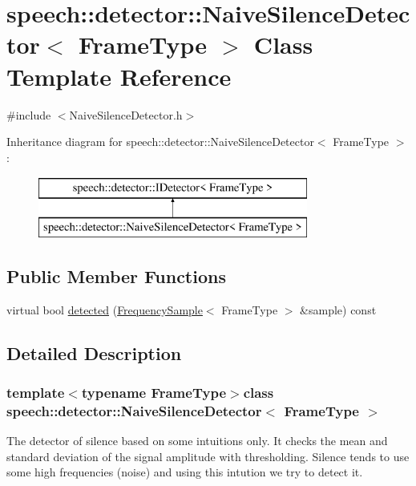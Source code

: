 \hypertarget{classspeech_1_1detector_1_1NaiveSilenceDetector}{\section{speech\+:\+:detector\+:\+:Naive\+Silence\+Detector$<$ Frame\+Type $>$ Class Template Reference}
\label{classspeech_1_1detector_1_1NaiveSilenceDetector}
}


{\ttfamily \#include $<$Naive\+Silence\+Detector.\+h$>$}

Inheritance diagram for speech\+:\+:detector\+:\+:Naive\+Silence\+Detector$<$ Frame\+Type $>$\+:\begin{figure}[H]
\begin{center}
\leavevmode
\includegraphics[height=2.000000cm]{classspeech_1_1detector_1_1NaiveSilenceDetector}
\end{center}
\end{figure}
\subsection*{Public Member Functions}
\begin{DoxyCompactItemize}
\item 
virtual bool \hyperlink{classspeech_1_1detector_1_1NaiveSilenceDetector_a5d2bc90b3012c10496b557a96a71aa68}{detected} (\hyperlink{classspeech_1_1raw__data_1_1FrequencySample}{Frequency\+Sample}$<$ Frame\+Type $>$ \&sample) const 
\end{DoxyCompactItemize}


\subsection{Detailed Description}
\subsubsection*{template$<$typename Frame\+Type$>$class speech\+::detector\+::\+Naive\+Silence\+Detector$<$ Frame\+Type $>$}

The detector of silence based on some intuitions only. It checks the mean and standard deviation of the signal amplitude with thresholding. Silence tends to use some high frequencies (noise) and using this intution we try to detect it. 

